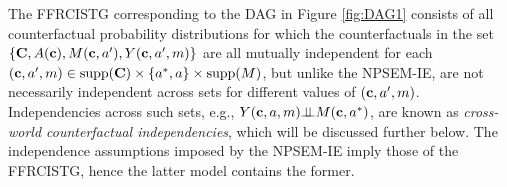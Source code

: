 \documentclass[12pt]{article}
\def\ci{\mbox{\ensuremath{\perp\!\!\!\perp}}}
\begin{document}
The FFRCISTG corresponding to the DAG in Figure \ref{fig:DAG1} consists of all counterfactual probability distributions for which the counterfactuals in the set $\{{\bf C}, \allowbreak A({\bf c}), \allowbreak M({\bf c}, a'), \allowbreak Y({\bf c}, a', m)\}$ are all mutually independent for each $({\bf c}, a', m)\in \text{supp}({\bf C})\times\{a^*,a\}\times\text{supp}(M)$, but unlike the NPSEM-IE, are not necessarily independent across sets for different values of $({\bf c}, a', m)$. Independencies across such sets, e.g., $Y({\bf c},a,m)\ci M({\bf c},a^*)$, are known as \emph{cross-world counterfactual independencies}, which will be discussed further below. The independence assumptions imposed by the NPSEM-IE imply those of the FFRCISTG, hence the latter model contains the former.


\end{document}
